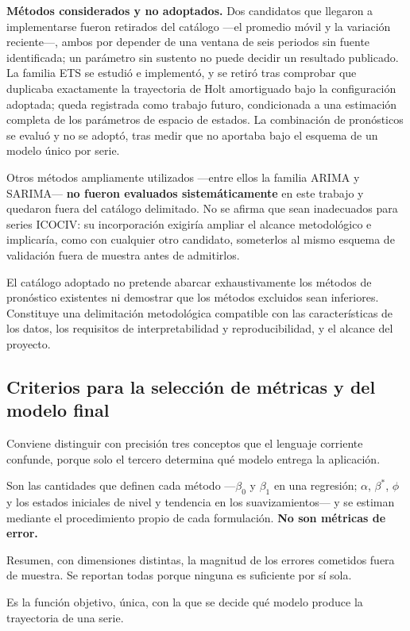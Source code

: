\documentclass[12pt,letterpaper]{article}
\newcommand{\ICOCIV}{ICOCIV}
\begin{document}
\textbf{Métodos considerados y no adoptados.} Dos candidatos que llegaron a implementarse fueron retirados del catálogo ---el promedio móvil y la variación reciente---, ambos por depender de una ventana de seis periodos sin fuente identificada; un parámetro sin sustento no puede decidir un resultado publicado. La familia ETS se estudió e implementó, y se retiró tras comprobar que duplicaba exactamente la trayectoria de Holt amortiguado bajo la configuración adoptada; queda registrada como trabajo futuro, condicionada a una estimación completa de los parámetros de espacio de estados. La combinación de pronósticos se evaluó y no se adoptó, tras medir que no aportaba bajo el esquema de un modelo único por serie.

Otros métodos ampliamente utilizados ---entre ellos la familia ARIMA y SARIMA--- \textbf{no fueron evaluados sistemáticamente} en este trabajo y quedaron fuera del catálogo delimitado. No se afirma que sean inadecuados para series \ICOCIV{}: su incorporación exigiría ampliar el alcance metodológico e implicaría, como con cualquier otro candidato, someterlos al mismo esquema de validación fuera de muestra antes de admitirlos.

El catálogo adoptado no pretende abarcar exhaustivamente los métodos de pronóstico existentes ni demostrar que los métodos excluidos sean inferiores. Constituye una delimitación metodológica compatible con las características de los datos, los requisitos de interpretabilidad y reproducibilidad, y el alcance del proyecto.

\subsection{Criterios para la selección de métricas y del modelo final}
\label{sec:criterios_metricas}

Conviene distinguir con precisión tres conceptos que el lenguaje corriente confunde, porque solo el tercero determina qué modelo entrega la aplicación.

\begin{description}[leftmargin=*]
    \item[Parámetros del modelo.] Son las cantidades que definen cada método ---\(\beta_0\) y \(\beta_1\) en una regresión; \(\alpha\), \(\beta^{*}\), \(\phi\) y los estados iniciales de nivel y tendencia en los suavizamientos--- y se estiman mediante el procedimiento propio de cada formulación. \textbf{No son métricas de error.}
    \item[Métricas de desempeño.] Resumen, con dimensiones distintas, la magnitud de los errores cometidos fuera de muestra. Se reportan todas porque ninguna es suficiente por sí sola.
    \item[Criterio de selección.] Es la función objetivo, única, con la que se decide qué modelo produce la trayectoria de una serie.
\end{description}
\end{document}
